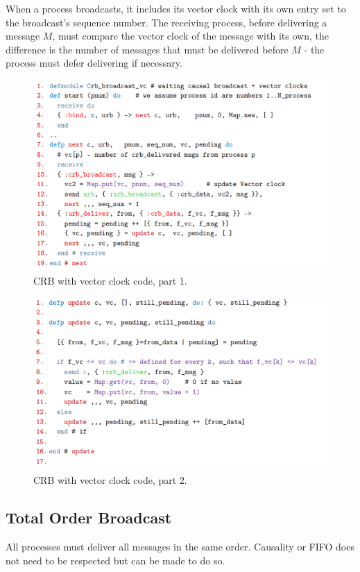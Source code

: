\documentclass[11pt]{article}
\begin{document}
When a process broadcasts, it includes its vector clock with its own entry set to the broadcast's sequence number.
The receiving process, before delivering a message $M$, must compare the vector clock of the message with its own, the difference is the number of messages that must be delivered before $M$ - the process must defer delivering if necessary.

\begin{figure}[htb!]
  \centering
  \caption{CRB with vector clock code, part 1.}
  \includegraphics[scale=0.3]{vccode1}
\end{figure}

\begin{figure}[htb!]
  \centering
  \caption{CRB with vector clock code, part 2.}
  \includegraphics[scale=0.3]{vccode2}
\end{figure}

\subsection{Total Order Broadcast}
All processes must deliver all messages in the same order.
Causality or FIFO does not need to be respected but can be made to do so.
\end{document}

